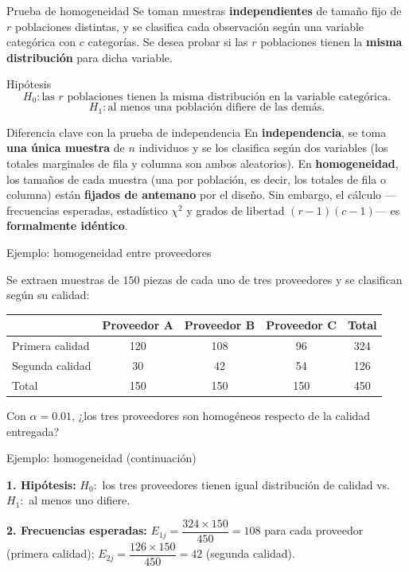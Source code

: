 \documentclass[aspectratio=169,11pt]{beamer}
\begin{document}
\begin{frame}{Prueba de homogeneidad}
Se toman muestras \textbf{independientes} de tamaño fijo de $r$ poblaciones distintas, y se clasifica cada observación según una variable categórica con $c$ categorías. Se desea probar si las $r$ poblaciones tienen la \textbf{misma distribución} para dicha variable.

\begin{block}{Hipótesis}
\[
H_0: \text{las } r \text{ poblaciones tienen la misma distribución en la variable categórica.}
\]
\[
H_1: \text{al menos una población difiere de las demás.}
\]
\end{block}

\begin{alertblock}{Diferencia clave con la prueba de independencia}
En \textbf{independencia}, se toma \textbf{una única muestra} de $n$ individuos y se los clasifica según dos variables (los totales marginales de fila y columna son ambos aleatorios). En \textbf{homogeneidad}, los tamaños de cada muestra (una por población, es decir, los totales de fila o columna) están \textbf{fijados de antemano} por el diseño. Sin embargo, el cálculo —frecuencias esperadas, estadístico $\chi^2$ y grados de libertad $(r-1)(c-1)$— es \textbf{formalmente idéntico}.
\end{alertblock}
\end{frame}

\begin{frame}{Ejemplo: homogeneidad entre proveedores}
\begin{example}
Se extraen muestras de $150$ piezas de cada uno de tres proveedores y se clasifican según su calidad:
\begin{center}
\begin{tabular}{@{}lccc|c@{}}
\toprule
 & Proveedor A & Proveedor B & Proveedor C & Total \\
\midrule
Primera calidad & 120 & 108 & 96 & 324 \\
Segunda calidad & 30 & 42 & 54 & 126 \\
\midrule
Total & 150 & 150 & 150 & 450 \\
\bottomrule
\end{tabular}
\end{center}
Con $\alpha=0.01$, ¿los tres proveedores son homogéneos respecto de la calidad entregada?

\end{example}
\end{frame}

\begin{frame}{Ejemplo: homogeneidad (continuación)}
\begin{example}
\textbf{1. Hipótesis:} $H_0:$ los tres proveedores tienen igual distribución de calidad vs. $H_1:$ al menos uno difiere.

\textbf{2. Frecuencias esperadas:} $E_{1j}=\dfrac{324\times150}{450}=108$ para cada proveedor (primera calidad); $E_{2j}=\dfrac{126\times150}{450}=42$ (segunda calidad).

\end{example}
\end{frame}
\end{document}
